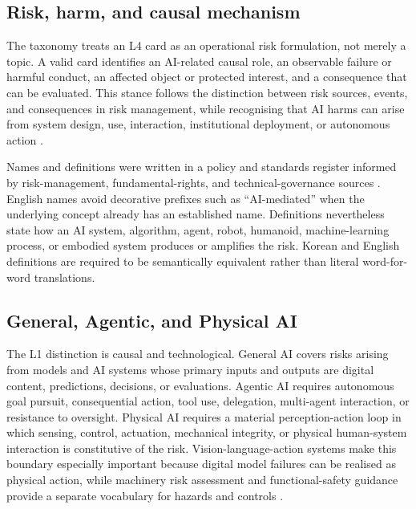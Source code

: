 \documentclass[10pt,a4paper]{article}
\begin{document}
\subsection{Risk, harm, and causal mechanism}

The taxonomy treats an L4 card as an operational risk formulation, not merely a topic. A valid card identifies an AI-related causal role, an observable failure or harmful conduct, an affected object or protected interest, and a consequence that can be evaluated. This stance follows the distinction between risk sources, events, and consequences in risk management, while recognising that AI harms can arise from system design, use, interaction, institutional deployment, or autonomous action \citep{nist2023,weidinger2022,slattery2024}.

Names and definitions were written in a policy and standards register informed by risk-management, fundamental-rights, and technical-governance sources \citep{nist2023,iso23894,euaiact2024,reuel2024}. English names avoid decorative prefixes such as ``AI-mediated'' when the underlying concept already has an established name. Definitions nevertheless state how an AI system, algorithm, agent, robot, humanoid, machine-learning process, or embodied system produces or amplifies the risk. Korean and English definitions are required to be semantically equivalent rather than literal word-for-word translations.

\subsection{General, Agentic, and Physical AI}

The L1 distinction is causal and technological. General AI covers risks arising from models and AI systems whose primary inputs and outputs are digital content, predictions, decisions, or evaluations. Agentic AI requires autonomous goal pursuit, consequential action, tool use, delegation, multi-agent interaction, or resistance to oversight. Physical AI requires a material perception-action loop in which sensing, control, actuation, mechanical integrity, or physical human-system interaction is constitutive of the risk. Vision-language-action systems make this boundary especially important because digital model failures can be realised as physical action, while machinery risk assessment and functional-safety guidance provide a separate vocabulary for hazards and controls \citep{brohan2023,kim2024openvla,guiochet2017,iso12100,iso5469}.
\end{document}
